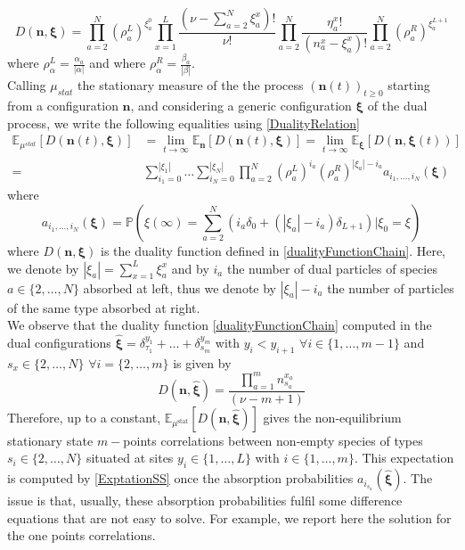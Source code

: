 \documentclass[10pt]{article}
\numberwithin{equation}{section}
\numberwithin{equation}{subsection}
\begin{document}
\begin{equation}\label{dualityFunctionChain}
	D(\bm{n},\bm{\xi})=\prod_{a=2}^{N}\left(\rho_{a}^{L}\right)^{\xi_{a}^{0}}\prod_{x=1}^{L}\frac{(\nu-\sum_{a=2}^{N}\xi_{a}^{x})!}{\nu!}\prod_{a=2}^{N}\frac{\eta_{a}^{x}!}{(n_{a}^{x}-\xi_{a}^{x})!}\prod_{a=2}^{N}\left(\rho_{a}^{R}\right)^{\xi_{a}^{L+1}}
\end{equation}
where $\rho_{\alpha}^{L}=\frac{\alpha_{a}}{|\alpha|}$ and where $\rho_{\alpha}^{R}=\frac{\beta_{a}}{|\beta|}$.\\
Calling $\mu_{stat}$ the stationary measure of the the process $(\bm{n}(t))_{t\geq 0}$ starting from a configuration $\bm{n}$, and considering a generic configuration $\bm{\xi}$ of the dual process, we write the following equalities using \eqref{DualityRelation}
\begin{equation}\label{ExptationSS}
	\begin{split}
		\mathbb{E}_{\mu^{stat}}\left[D(\bm{n}(t),\bm{\xi})\right]&=\lim_{t\to\infty}\mathbb{E}_{\bm{n}}\left[D(\bm{n}(t),\bm{\xi})\right]=\lim_{t\to\infty}\mathbb{E}_{\bm{\xi}}\left[D(\bm{n},\bm{\xi}(t))\right]
		\\=&
		\sum_{i_{1}=0}^{|\xi_{1}|}\ldots\sum_{i_{N}=0}^{|\xi_{N}|}\prod_{a=2}^{N}\left(\rho_{a}^{L}\right)^{i_{a}}\left(\rho_{a}^{R}\right)^{|\xi_{a}|-i_{a}}a_{i_{1},\ldots,i_{N}}(\bm{\xi})
	\end{split}
\end{equation}
where 
\begin{equation}\label{Pass}
	a_{i_{1},\ldots,i_{N}}(\bm{\xi})=\mathbb{P}\left(\xi(\infty)=\sum_{a=2}^{N}\left(i_{a}\delta_{0}+(|\xi_{a}|-i_{a})\delta_{L+1}\right)| \xi_{0}=\xi\right)
\end{equation}
where $D(\bm{n},\bm{\xi})$ is the duality function defined in \eqref{dualityFunctionChain}. Here, we denote by $|\xi_{a}|=\sum_{x=1}^{L}\xi_{a}^{x}$ and by $i_{a}$ the number of dual particles of species $a\in\{2,\ldots,N\}$ absorbed at left, thus we denote by $|\xi_{a}|-i_{a}$ the number of particles of the same type absorbed at right.\\
We observe that the duality function \eqref{dualityFunctionChain} computed in the dual configurations $\bm{\widehat{\xi}}=\delta_{\tau_{1}}^{y_{1}}+\ldots+\delta_{s_{m}}^{y_{m}}$ with $y_{i}<y_{i+1}$ $\forall i\in \{1,\ldots,m-1\}$ and $s_{x}\in \{2,\ldots,N\}$ $\forall i=\{2,\ldots,m\}$ is given by 
\begin{equation}
	D(\bm{n},\bm{\widehat{\xi}})= \frac{\prod_{a=1}^{m}n_{s_{a}}^{x_{a}}}{(\nu-m+1)}
\end{equation}
Therefore, up to a constant, $\mathbb{E}_{\mu^{\text{stat}}}\left[D(\bm{n},\bm{\widehat{\xi}})\right]$ gives the non-equilibrium stationary state $m-$points correlations between non-empty species of types $s_{i}\in\{2,\ldots,N\}$ situated at sites $y_{i}\in\{1,\ldots,L\}$ with $i\in \{1,\ldots,m\}$. This expectation is computed by \eqref{ExptationSS} once the absorption probabilities $a_{i_{s_{a}}}(\widehat{\bm{\xi}})$. The issue is that, usually, these absorption probabilities fulfil some difference equations that are not easy to solve. For example, we report here the solution for the one points correlations. 
\end{document}
